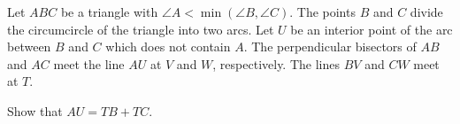 Let $ABC$ be a triangle with $\angle A < \min(\angle B, \angle C)$.
The points $B$ and $C$ divide the circumcircle of the triangle into two arcs.
Let $U$ be an interior point of the arc between $B$ and $C$ which does not contain $A$.
The perpendicular bisectors of $ AB$ and $ AC$ meet the line $AU$ at $V$ and $W$, respectively.
The lines $BV$ and $CW$ meet at $T$.

Show that $AU = TB + TC$.